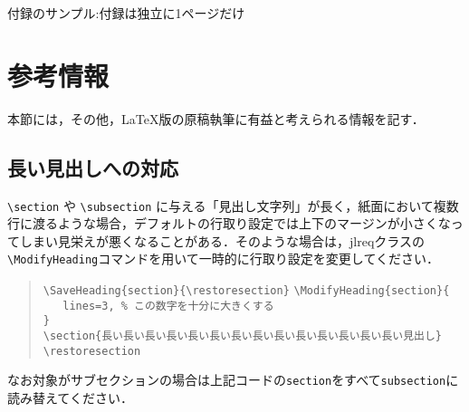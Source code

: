 \documentclass[
  platex, dvipdfmx,  %
]{nlp2025}
\newcommand{\code}[1]{\texttt{#1}}
\begin{document}




\clearpage
\appendix
{付録のサンプル:付録は独立に1ページだけ}
\section{参考情報}
本節には，その他，LaTeX版の原稿執筆に有益と考えられる情報を記す．


\subsection{長い見出しへの対応}
\verb|\section|
や
\verb|\subsection|
に与える「見出し文字列」が長く，紙面において複数行に渡るような場合，デフォルトの行取り設定では上下のマージンが小さくなってしまい見栄えが悪くなることがある．そのような場合は，jlreqクラスの \verb|\ModifyHeading|コマンドを用いて一時的に行取り設定を変更してください．

\begin{quote}
\verb|\SaveHeading{section}{\restoresection}|
\verb|\ModifyHeading{section}{|\\
\verb|   lines=3, % この数字を十分に大きくする|\\
\verb|}|\\
\verb|\section{長い長い長い長い長い長い長い長い長い長い長い長い長い長い見出し}|\\
\verb|\restoresection|
\end{quote}

なお対象がサブセクションの場合は上記コードの\code{section}をすべて\code{subsection}に読み替えてください．
\end{document}

